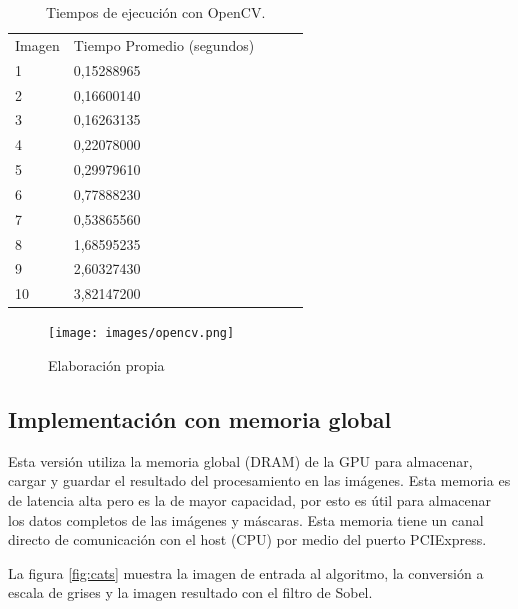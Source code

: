\documentclass[10pt,journal,compsoc]{IEEEtran}
\begin{document}
\begin{table}[ht]
\centering
\caption{Tiempos de ejecución con OpenCV. 
}
\label{tab:secuencial}
\begin{tabular}{lllll}
Imagen & Tiempo Promedio (segundos) &  &  &  \\
1      & 0,15288965                        &  &  &  \\
2      & 0,16600140                        &  &  &  \\
3      & 0,16263135                        &  &  &  \\
4      & 0,22078000                        &  &  &  \\
5      & 0,29979610                        &  &  &  \\
6      & 0,77888230                        &  &  &  \\
7      & 0,53865560                        &  &  &  \\
8      & 1,68595235                        &  &  &  \\
9      & 2,60327430                        &  &  &  \\
10     & 3,82147200                        &  &  & 
\end{tabular}
\end{table}

\begin{figure}[ht]
    \begin{center}
        \texttt{[image: images/opencv.png]}
    \end{center}
    \caption{Elaboración propia}
\end{figure}


\subsection{Implementación con memoria global}

Esta versión utiliza la memoria global (DRAM) de la GPU para almacenar, cargar y guardar el resultado del procesamiento en las imágenes. Esta memoria es de latencia alta pero es la de mayor capacidad, por esto es útil para almacenar los datos completos de las imágenes y máscaras. Esta memoria tiene un canal directo de comunicación con el host (CPU) por medio del puerto PCIExpress.

La figura \ref{fig:cats} muestra la imagen de entrada al algoritmo, la conversión a escala de grises y la imagen resultado con el filtro de Sobel.
\end{document}
